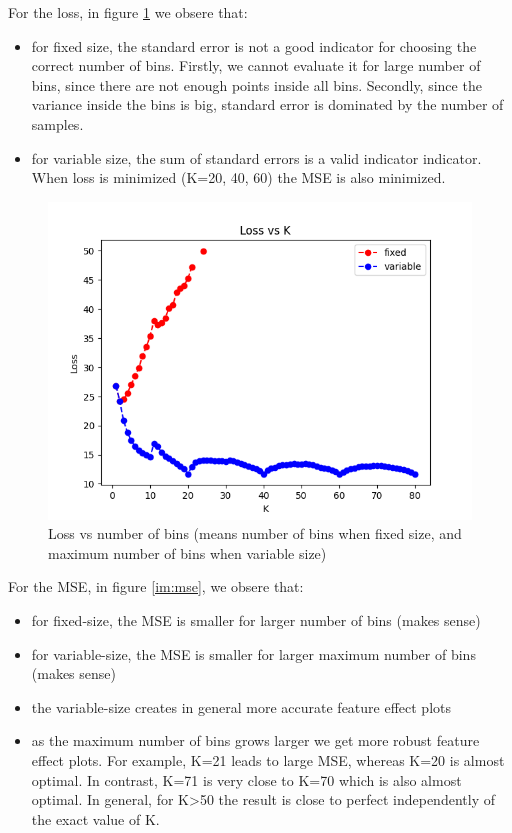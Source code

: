 \documentclass{article}
\begin{document}
For the loss, in figure \ref{im:loss} we obsere that:

\begin{itemize}
\item for fixed size, the standard error is not a good indicator for
  choosing the correct number of bins. Firstly, we cannot evaluate it
  for large number of bins, since there are not enough points inside
  all bins. Secondly, since the variance inside the bins is big,
  standard error is dominated by the number of samples.
\item for variable size, the sum of standard errors is a valid
  indicator indicator. When loss is minimized (K=20, 40, 60) the MSE
  is also minimized.
\end{itemize}

\begin{figure}[h]
\centering
\includegraphics[width=0.9\linewidth]{Figure_7.png}
\caption{Loss vs number of bins (means number of bins when fixed size, and maximum number of bins when variable size)}
\label{im:loss}
\end{figure}


For the MSE, in figure \ref{im:mse}, we obsere that:

\begin{itemize}
\item for fixed-size, the MSE is smaller for larger number of bins (makes sense)
\item for variable-size, the MSE is smaller for larger maximum number of bins (makes sense)
\item the variable-size creates in general more accurate feature effect plots
\item as the maximum number of bins grows larger we get more robust
  feature effect plots. For example, K=21 leads to large MSE, whereas K=20 is almost optimal. In contrast, K=71 is very close to K=70 which is also almost optimal. In general, for K>50 the result is close to perfect independently of the exact value of K.
\end{itemize}
\end{document}
